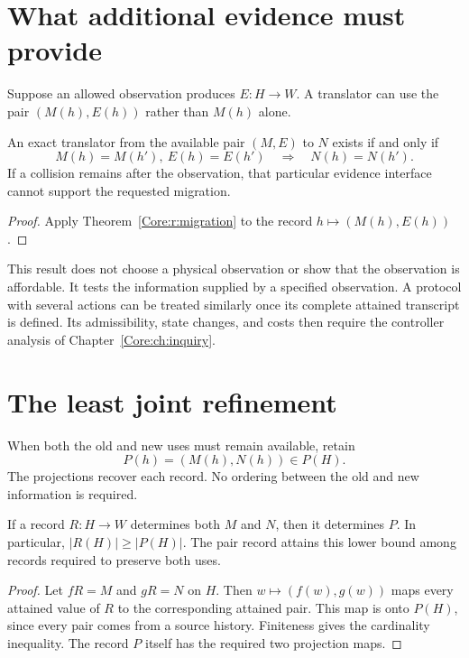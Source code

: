 \section{What additional evidence must provide}
Suppose an allowed observation produces $E:H\to W$. A translator can use the pair $(M(h),E(h))$ rather than $M(h)$ alone.

\begin{Corecorollary}\label{Core:r:migration-evidence}
An exact translator from the available pair $(M,E)$ to $N$ exists if and only if
\[
 M(h)=M(h'),\ E(h)=E(h')\quad\Longrightarrow\quad N(h)=N(h').
\]
If a collision remains after the observation, that particular evidence interface cannot support the requested migration.
\end{Corecorollary}
\begin{proof}
Apply Theorem~\ref{Core:r:migration} to the record $h\mapsto(M(h),E(h))$.
\end{proof}

This result does not choose a physical observation or show that the observation is affordable. It tests the information supplied by a specified observation. A protocol with several actions can be treated similarly once its complete attained transcript is defined. Its admissibility, state changes, and costs then require the controller analysis of Chapter~\ref{Core:ch:inquiry}.

\section{The least joint refinement}
When both the old and new uses must remain available, retain
\[
 P(h)=(M(h),N(h))\in P(H).
\]
The projections recover each record. No ordering between the old and new information is required.

\begin{Coreproposition}\label{Core:r:joint-refinement-record}
If a record $R:H\to W$ determines both $M$ and $N$, then it determines $P$. In particular, $|R(H)|\ge |P(H)|$. The pair record attains this lower bound among records required to preserve both uses.
\end{Coreproposition}
\begin{proof}
Let $fR=M$ and $gR=N$ on $H$. Then $w\mapsto(f(w),g(w))$ maps every attained value of $R$ to the corresponding attained pair. This map is onto $P(H)$, since every pair comes from a source history. Finiteness gives the cardinality inequality. The record $P$ itself has the required two projection maps.
\end{proof}


